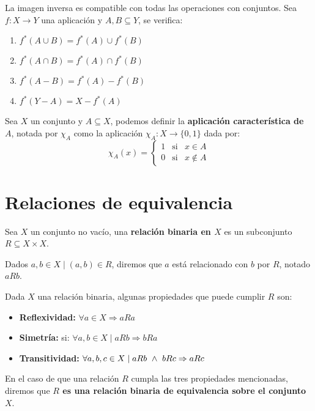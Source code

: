 \begin{prop}
    La imagen inversa es compatible con todas las operaciones con conjuntos. Sea $f:X\rightarrow Y$ una aplicación y $A,B\subseteq Y$, se verifica:
    \begin{enumerate}
        \item $f^*(A \cup B) = f^*(A) \cup f^*(B)$
        \item $f^*(A\cap B) = f^*(A)\cap f^*(B)$
        \item $f^*(A - B) = f^*(A) - f^*(B)$
        \item $f^*(Y - A) = X - f^*(A)$
    \end{enumerate}
    
\end{prop}

\begin{definicion}
    Sea $X$ un conjunto y $A\subseteq X$, podemos definir la \textbf{aplicación característica de $A$}, notada por $\chi_A$ como la aplicación $\chi_A:X\rightarrow \{0,1\}$ dada por:
    \begin{equation*}
        \chi_A(x) = \left\{\begin{array}{lcl}
                1 & \text{si} & x\in A \\
                0 & \text{si} & x\notin A
        \end{array}\right.
    \end{equation*}
\end{definicion}


\section{Relaciones de equivalencia}
\begin{definicion}
    Sea $X$ un conjunto no vacío, una \textbf{relación binaria en $X$} es un subconjunto $R \subseteq X \times X$.
        
    Dados $a, b \in X \mid (a, b) \in R$, diremos que $a$ está relacionado con $b$ por $R$, notado
    $aRb$.
\end{definicion}

Dada $X$ una relación binaria, algunas propiedades que puede cumplir $R$ son:
\begin{itemize}
    \item \textbf{Reflexividad:}  $\forall a \in X \Rightarrow aRa$
    \item \textbf{Simetría:} si: $\forall a,b \in X \mid aRb \Rightarrow bRa$
    \item \textbf{Transitividad:} $\forall a,b,c \in X \mid aRb \ \land \  bRc \Rightarrow aRc$
\end{itemize}
En el caso de que una relación $R$ cumpla las tres propiedades mencionadas, diremos que \textbf{$R$ es una relación binaria de equivalencia sobre el conjunto $X$}.

